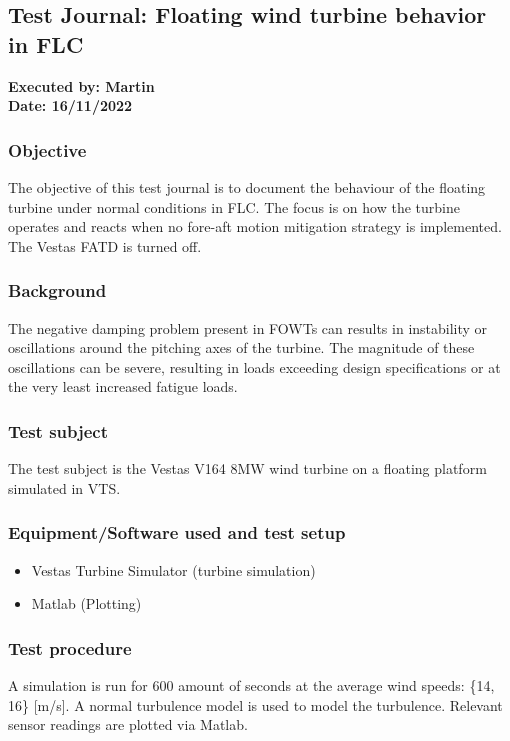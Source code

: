 \subsection{Test Journal: Floating wind turbine behavior in FLC} \label{app:tj_02}

\textbf{Executed by: Martin} \\
\textbf{Date: 16/11/2022}

\subsubsection{Objective}
The objective of this test journal is to document the behaviour of the floating turbine under normal conditions in FLC. The focus is on how the turbine operates and reacts when no fore-aft motion mitigation strategy is implemented. The Vestas FATD is turned off.

\subsubsection{Background}
The negative damping problem present in FOWTs can results in instability or oscillations around the pitching axes of the turbine. The magnitude of these oscillations can be severe, resulting in loads exceeding design specifications or at the very least increased fatigue loads.

\subsubsection{Test subject}
The test subject is the Vestas V164 8MW wind turbine on a floating platform simulated in VTS.

\subsubsection{Equipment/Software used and test setup}
\begin{itemize}
	\item Vestas Turbine Simulator (turbine simulation)
	\item Matlab (Plotting)
\end{itemize}

\subsubsection{Test procedure}
A simulation is run for 600 amount of seconds at the average wind speeds: \{14, 16\} [m/s]. A normal turbulence model is used to model the turbulence. Relevant sensor readings are plotted via Matlab.

